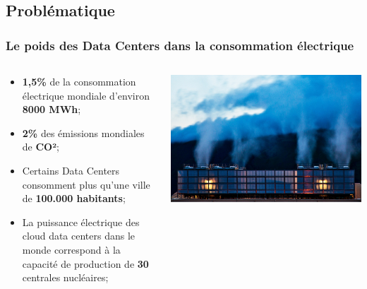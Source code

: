 \documentclass[xcolor=dvipsnames]{beamer}
\begin{document}
\subsection{Problématique}

\begin{frame}
\frametitle{Le poids des Data Centers dans la consommation électrique}
\begin{columns}
\begin{column}{0.55\textwidth}
\begin{block}{}
\begin{itemize}
\item \textbf{1,5\%} de la consommation électrique mondiale d’environ \textbf{8000 MWh};
\item \textbf{2\%} des émissions mondiales de \textbf{CO²};
\item Certains Data Centers consomment plus qu'une ville de \textbf{100.000 habitants};
\item La puissance électrique des cloud data centers dans le monde correspond à la capacité de production de \textbf{30} centrales nucléaires;
\end{itemize}
\end{block}
\end{column}
\begin{column}{0.40\textwidth}
\includegraphics[scale=0.072]{datacentre2.jpg}
\end{column}

\end{columns}
\end{frame}
\end{document}
